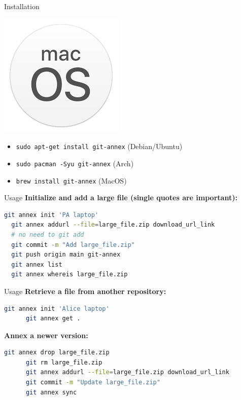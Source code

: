 \begin{frame}{Installation}
\begin{center}
\begin{minipage}{0.2\textwidth}
    \end{minipage}%
    \begin{minipage}{0.2\textwidth}
      \centering
      \includegraphics[width=0.5\linewidth]{images/macOS-logo.png}
    \end{minipage}
  \end{center}

  \vspace{0.5cm}

  \begin{itemize}
    \item \texttt{sudo apt-get install git-annex} (Debian/Ubuntu)
    \item \texttt{sudo pacman -Syu git-annex} (Arch)
    \item \texttt{brew install git-annex} (MacOS)
  \end{itemize}
\end{frame}

\begin{frame}[fragile]{Usage}
  \textbf{Initialize and add a large file (single quotes are important):}
  \begin{lstlisting}[language=bash]
  git annex init 'PA laptop'
  git annex addurl --file=large_file.zip download_url_link
  # no need to git add
  git commit -m "Add large_file.zip"
  git push origin main git-annex
  git annex list
  git annex whereis large_file.zip
\end{lstlisting}
\end{frame}

\begin{frame}[fragile]{Usage}
  \textbf{Retrieve a file from another repository:}
  \begin{lstlisting}[language=bash]
      git annex init 'Alice laptop'
      git annex get .
    \end{lstlisting}
  \textbf{Annex a newer version:}
    \begin{lstlisting}[language=bash]
      git annex drop large_file.zip
      git rm large_file.zip
      git annex addurl --file=large_file.zip download_url_link
      git commit -m "Update large_file.zip"
      git annex sync
  \end{lstlisting}
\end{frame}

